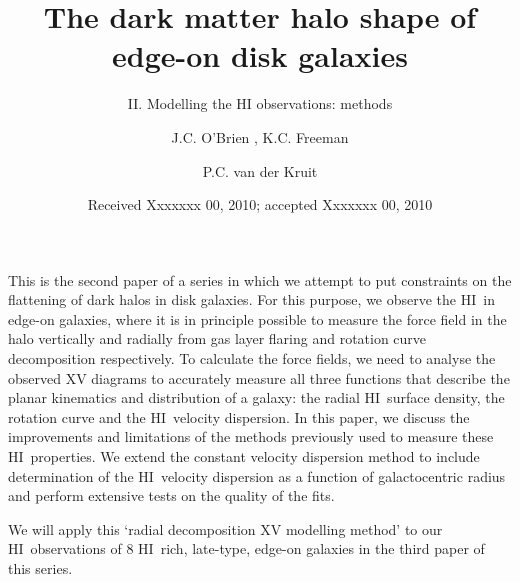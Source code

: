 \documentclass[traditabstract]{aa} %
\newcommand\HI{H{\small I}}
\begin{document}
%
   \title{The dark matter halo shape of edge-on disk galaxies}

\subtitle{II.  Modelling the HI observations: methods}

   \author{J.C. O'Brien
          ,
K.C. Freeman
          \and
          P.C. van der Kruit}


   \date{Received Xxxxxxx 00, 2010; accepted Xxxxxxx 00, 2010}

 
  \abstract
   {This is the second paper of a series in which we attempt to put
constraints on the flattening of dark halos in disk galaxies. For 
this purpose, we
observe the \HI\ in edge-on galaxies, where it is in principle
possible to measure the force field in the halo vertically and radially
from gas layer flaring and rotation curve decomposition respectively.  
To calculate the force fields, we need to analyse the observed XV diagrams 
to accurately measure all three functions that describe the
planar kinematics and distribution of a galaxy: the radial \HI\ surface
density, the rotation curve and the \HI\ velocity dispersion. 
In this  paper, we discuss the improvements and limitations of the methods 
previously used to measure these \HI\ properties. We extend the 
constant velocity dispersion method to include determination of the \HI\
velocity dispersion as a function of galactocentric radius and perform
extensive tests on the quality of the fits.

We will apply this `radial decomposition XV modelling method' to our 
\HI\ observations of 8 \HI\ rich,
late-type, edge-on galaxies in the third paper of this series.  }
   {}
\end{document}
